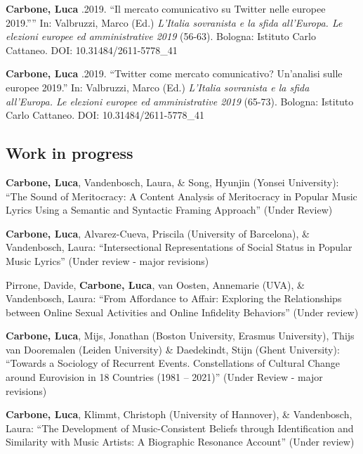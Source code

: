 \documentclass[12pt,]{article}
\begin{document}
\textbf{Carbone, Luca} .2019. ``Il mercato comunicativo su Twitter nelle
europee 2019.'''' In: Valbruzzi, Marco (Ed.) \emph{L'Italia sovranista e
la sfida all'Europa. Le elezioni europee ed amministrative 2019}
(56-63). Bologna: Istituto Carlo Cattaneo. DOI: 10.31484/2611-5778\_41

\textbf{Carbone, Luca} .2019. ``Twitter come mercato comunicativo?
Un'analisi sulle europee 2019.'' In: Valbruzzi, Marco (Ed.)
\emph{L'Italia sovranista e la sfida all'Europa. Le elezioni europee ed
amministrative 2019} (65-73). Bologna: Istituto Carlo Cattaneo. DOI:
10.31484/2611-5778\_41 \newline

\hypertarget{work-in-progress}{%
\subsection{Work in progress}\label{work-in-progress}}

\textbf{Carbone, Luca}, Vandenbosch, Laura, \& Song, Hyunjin (Yonsei
University): ``The Sound of Meritocracy: A Content Analysis of
Meritocracy in Popular Music Lyrics Using a Semantic and Syntactic
Framing Approach'' (Under Review) \newline

\textbf{Carbone, Luca}, Alvarez-Cueva, Priscila (University of
Barcelona), \& Vandenbosch, Laura: ``Intersectional Representations of
Social Status in Popular Music Lyrics'' (Under review - major revisions)
\newline

Pirrone, Davide, \textbf{Carbone, Luca}, van Oosten, Annemarie (UVA), \&
Vandenbosch, Laura: ``From Affordance to Affair: Exploring the
Relationships between Online Sexual Activities and Online Infidelity
Behaviors'' (Under review) \newline

\textbf{Carbone, Luca}, Mijs, Jonathan (Boston University, Erasmus
University), Thijs van Dooremalen (Leiden University) \& Daedekindt,
Stijn (Ghent University): ``Towards a Sociology of Recurrent Events.
Constellations of Cultural Change around Eurovision in 18 Countries
(1981 -- 2021)'' (Under Review - major revisions) \newline

\textbf{Carbone, Luca}, Klimmt, Christoph (University of Hannover), \&
Vandenbosch, Laura: ``The Development of Music-Consistent Beliefs
through Identification and Similarity with Music Artists: A Biographic
Resonance Account'' (Under review) \newline
\end{document}
